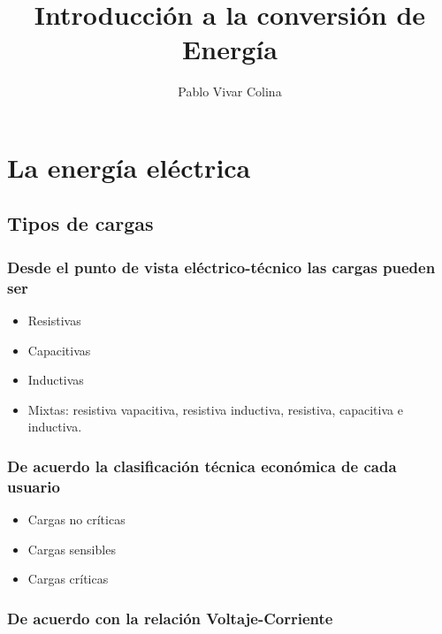 \documentclass[]{article}
\title{Introducción a la conversión de Energía}
\author{Pablo Vivar Colina}
\begin{document}
	

\maketitle





\section{La energía eléctrica}

\subsection{Tipos de cargas}

\subsubsection{Desde el punto de vista eléctrico-técnico las cargas pueden ser}

\begin{itemize}
	\item Resistivas
	\item Capacitivas
	\item Inductivas
	\item Mixtas: resistiva vapacitiva, resistiva inductiva, resistiva, capacitiva e inductiva.
\end{itemize}


\subsubsection{De acuerdo la clasificación técnica económica de cada usuario}

\begin{itemize}
	\item Cargas no críticas
	\item Cargas sensibles
	\item Cargas críticas
	
\end{itemize}

\subsubsection{De acuerdo con la relación Voltaje-Corriente}
\end{document}
